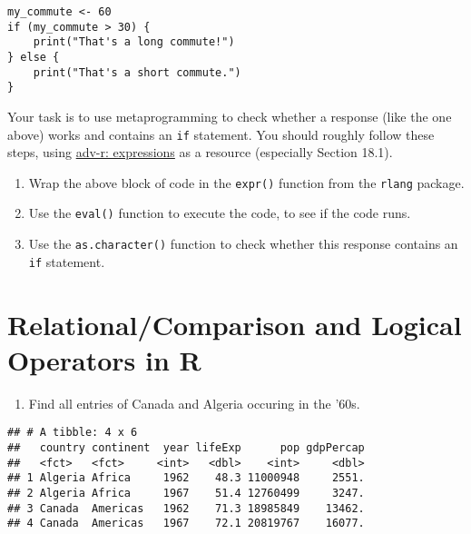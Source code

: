 \documentclass[]{article}
\newenvironment{Shaded}{\begin{snugshade}}{\end{snugshade}}
\newcommand{\KeywordTok}[1]{\textcolor[rgb]{0.13,0.29,0.53}{\textbf{{#1}}}}
\newcommand{\DecValTok}[1]{\textcolor[rgb]{0.00,0.00,0.81}{{#1}}}
\newcommand{\StringTok}[1]{\textcolor[rgb]{0.31,0.60,0.02}{{#1}}}
\newcommand{\NormalTok}[1]{{#1}}
\providecommand{\tightlist}{%
  \setlength{\itemsep}{0pt}\setlength{\parskip}{0pt}}
\begin{document}
\begin{verbatim}
my_commute <- 60
if (my_commute > 30) {
    print("That's a long commute!")
} else {
    print("That's a short commute.")
}
\end{verbatim}

Your task is to use metaprogramming to check whether a response (like
the one above) works and contains an \texttt{if} statement. You should
roughly follow these steps, using
\href{https://adv-r.hadley.nz/expressions.html}{adv-r: expressions} as a
resource (especially Section 18.1).

\begin{enumerate}
\def\labelenumi{\arabic{enumi}.}
\tightlist
\item
  Wrap the above block of code in the \texttt{expr()} function from the
  \texttt{rlang} package.
\item
  Use the \texttt{eval()} function to execute the code, to see if the
  code runs.
\item
  Use the \texttt{as.character()} function to check whether this
  response contains an \texttt{if} statement.
\end{enumerate}

\section{Relational/Comparison and Logical Operators in
R}\label{relationalcomparison-and-logical-operators-in-r}

\begin{enumerate}
\def\labelenumi{\arabic{enumi}.}
\tightlist
\item
  Find all entries of Canada and Algeria occuring in the '60s.
\end{enumerate}

\begin{Shaded}
\end{Shaded}

\begin{verbatim}
## # A tibble: 4 x 6
##   country continent  year lifeExp      pop gdpPercap
##   <fct>   <fct>     <int>   <dbl>    <int>     <dbl>
## 1 Algeria Africa     1962    48.3 11000948     2551.
## 2 Algeria Africa     1967    51.4 12760499     3247.
## 3 Canada  Americas   1962    71.3 18985849    13462.
## 4 Canada  Americas   1967    72.1 20819767    16077.
\end{verbatim}
\end{document}

